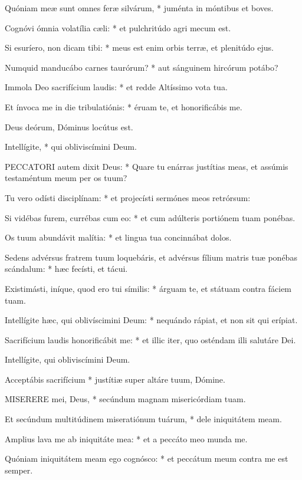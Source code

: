 Quóniam meæ sunt omnes feræ silvárum, * juménta in móntibus et boves.

Cognóvi ómnia volatília cæli: * et pulchritúdo agri mecum est.

Si esuríero, non dicam tibi: * meus est enim orbis terræ, et plenitúdo ejus.

Numquid manducábo carnes taurórum? * aut sánguinem hircórum potábo?

Immola Deo sacrifícium laudis: * et redde Altíssimo vota tua.

Et ínvoca me in die tribulatiónis: * éruam te, et honorificábis me.

 Deus deórum, Dóminus locútus est.

 Intellígite, * qui obliviscímini Deum.


\lettrine[lines=2]{P}{ECCATORI} autem dixit Deus: * Quare tu enárras justítias meas, et assúmis testaméntum meum per os tuum?

Tu vero odísti disciplínam: * et projecísti sermónes meos retrórsum:

Si vidébas furem, currébas cum eo: * et cum adúlteris portiónem tuam ponébas.

Os tuum abundávit malítia: * et lingua tua concinnábat dolos.

Sedens advérsus fratrem tuum loquebáris, et advérsus fílium matris tuæ ponébas scándalum: * hæc fecísti, et tácui.

Existimásti, iníque, quod ero tui símilis: * árguam te, et státuam contra fáciem tuam.

Intellígite hæc, qui oblivíscimini Deum: * nequándo rápiat, et non sit qui erípiat.

Sacrifícium laudis honorificábit me: * et illic iter, quo osténdam illi salutáre Dei.

 Intellígite, qui obliviscímini Deum.

 Acceptábis sacrifícium * justítiæ super altáre tuum, Dómine.


\lettrine[lines=2]{M}{ISERERE} mei, Deus, * secúndum magnam misericórdiam tuam.

Et secúndum multitúdinem miseratiónum tuárum, * dele iniquitátem meam.

Amplius lava me ab iniquitáte mea: * et a peccáto meo munda me.

Quóniam iniquitátem meam ego cognósco: * et peccátum meum contra me est semper.

